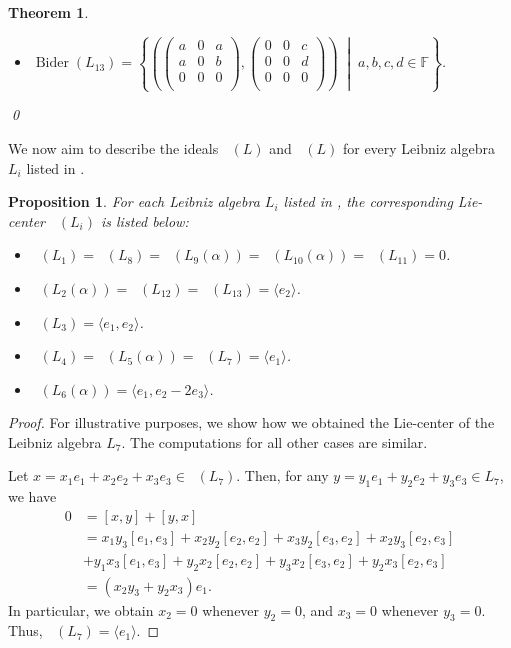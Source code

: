 \documentclass[11pt,a4paper]{amsart}
\theoremstyle{plain}
\newtheorem{theorem}[subsection]{Theorem}
\newtheorem{proposition}[subsection]{Proposition}
\theoremstyle{definition}
\theoremstyle{remark}
\numberwithin{equation}{section}
\newcommand{\noproof}{\hfil\qed}
\newcommand{\0}{\emptyset}
\newcommand{\bF}{\mathbb{F}}
\DeclareMathOperator{\DerL}{Der_{Lie}}
\DeclareMathOperator{\Bider}{Bider}
\DeclareMathOperator{\ZL}{Z_{Lie}}
\begin{document}
\begin{theorem}
\begin{itemize}[itemsep=0.5em]
		\item  $\Bider(L_{13})=\left\lbrace \left( \begin{pmatrix}
		      a & 0 & a \\
		      a & 0 & b \\
		      0 & 0 & 0 \\
		\end{pmatrix},
		\begin{pmatrix}
			0 & 0 & c \\
			0 & 0 & d \\
			0 & 0 & 0 \\
		\end{pmatrix} \right)  \; \middle| \; a,b,c,d \in \bF \right\rbrace$.
	\end{itemize} \noproof
\end{theorem}

We now aim to describe the ideals $\ZL(L)$ and $\DerL(L)$ for every Leibniz algebra $L_i$ listed in .

\begin{proposition}
	For each Leibniz algebra $L_i$ listed in , the corresponding Lie-center $\ZL(L_i)$ is listed below:
	\begin{itemize}
		\item  $\ZL(L_1)=\ZL(L_8)=\ZL(L_9(\alpha))=\ZL(L_{10}(\alpha))=\ZL(L_{11})=0$.
		\item  $\ZL(L_2(\alpha))=\ZL(L_{12})=\ZL(L_{13})=\langle e_2 \rangle$.
		\item  $\ZL(L_3)=\langle e_1,e_2\rangle$.
		\item  $\ZL(L_4)=\ZL(L_5(\alpha))=\ZL(L_7)=\langle e_1 \rangle$.
		\item  $\ZL(L_6(\alpha))=\langle e_1,e_2-2e_3 \rangle$.
	\end{itemize}
\end{proposition}

\begin{proof}
For illustrative purposes, we show how we obtained the Lie-center of the Leibniz algebra $L_7$. The computations for all other cases are similar. 
	
	Let $x=x_1e_1+x_2e_2+x_3e_3 \in \ZL(L_7)$. Then, for any $y=y_1e_1+y_2e_2+y_3e_3\in L_7$, we have
	\begin{align*}
		0 & =[x,y]+[y,x]                                                     \\
		  & =x_1y_3[e_1,e_3]+x_2y_2[e_2,e_2]+x_3y_2[e_3,e_2]+x_2y_3[e_2,e_3] \\
		  & +y_1x_3[e_1,e_3]+y_2x_2[e_2,e_2]+y_3x_2[e_3,e_2]+y_2x_3[e_2,e_3] \\
		  & =(x_2 y_3 + y_2 x_3)e_1.                 %
	\end{align*}
	In particular, we obtain $x_2=0$ whenever $y_2=0$, and $x_3=0$ whenever $y_3=0$. Thus, $\ZL(L_7)=\langle e_1 \rangle$.
\end{proof} 
\end{document}
